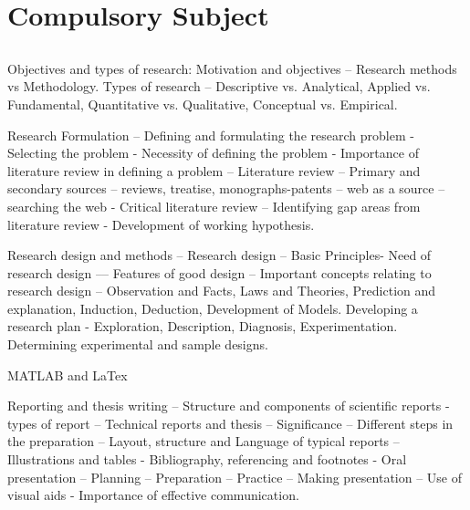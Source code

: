 \section{Compulsory Subject}
\subsection{\courseinfo}

Objectives and types of research: Motivation and objectives – Research methods vs Methodology. Types of research – Descriptive vs. Analytical, Applied vs. Fundamental, Quantitative vs. Qualitative, Conceptual vs. Empirical. 
 
Research Formulation – Defining and formulating the research problem - Selecting the problem - Necessity of defining the problem - Importance of literature review in defining a problem – Literature review – Primary and secondary sources – reviews, treatise, monographs-patents – web as a source – searching the web - Critical literature review – Identifying gap areas from literature review - Development of working hypothesis. 
 
Research design and methods – Research design – Basic Principles- Need of research design –– Features of good design – Important concepts relating to research design – Observation and Facts, Laws and Theories, Prediction and explanation, Induction, Deduction, Development of Models. Developing a research plan - Exploration, Description, Diagnosis, Experimentation. Determining experimental and sample designs. 
 
MATLAB and LaTex
 
Reporting and thesis writing – Structure and components of scientific reports - types of report – Technical reports and thesis – Significance – Different steps in the preparation – Layout, structure and Language of typical reports – Illustrations and tables - Bibliography, referencing and footnotes - Oral presentation – Planning – Preparation – Practice – Making presentation – Use of visual aids - Importance of effective communication. 

